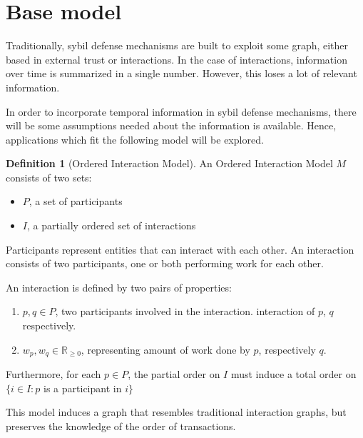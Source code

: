 \documentclass[a4paper,11pt]{book}
\newcommand{\bb}{\mathbb}
\theoremstyle{definition}
\newtheorem{definition}{Definition}
\begin{document}
\section{Base model}

Traditionally, sybil defense mechanisms are built to exploit some graph,
either based in external trust or interactions. In the case of interactions,
information over time is summarized in a single number. However, this loses
a lot of relevant information.

In order to incorporate temporal information in sybil defense mechanisms,
there will be some assumptions needed about the information is available.
Hence, applications which fit the following model will be explored.

\begin{definition}[Ordered Interaction Model]
    An Ordered Interaction Model $M$ consists of two sets:  
    
    \begin{itemize}
        \item $P$, a set of participants
        \item $I$, a partially ordered set of interactions
    \end{itemize}

    Participants represent entities that can interact with each other.
    An interaction consists of two participants, one or both performing
    work for each other. 
    
    An interaction is defined by two pairs of properties:
    \begin{enumerate}
        \item $p, q \in P$, two participants involved in the interaction.
            interaction of $p$, $q$ respectively.
        \item $w_p, w_q \in \bb{R}_{\geq0}$, representing amount of work done by $p$, respectively $q$.
    \end{enumerate}

    Furthermore, for each $p \in P$, the partial order on $I$ must induce a total order on $\{i \in I : p$ is a participant in $i\}$
\end{definition}


  
This model induces a graph that resembles traditional interaction graphs, but preserves the knowledge
of the order of transactions.
\end{document}
